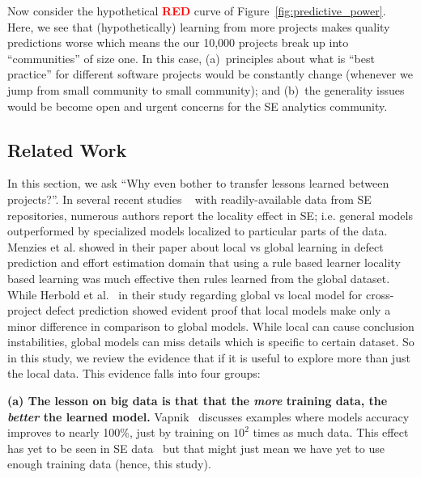 \documentclass[sigconf]{acmart}
\theoremstyle{break}
\begin{document}
Now consider the hypothetical \textcolor{red}{{\bf RED}} curve of Figure~\ref{fig:predictive_power}. Here, we see that (hypothetically)  learning from more projects makes quality predictions worse which means the our 10,000 projects break up into ``communities'' of size one. In this case,  (a)~principles about what is ``best practice'' for different software projects would be constantly change (whenever we jump from small community to small community); and (b)~the generality issues would be become open and urgent concerns for the SE analytics community.


\subsection{Related Work}
\label{sec:related}

In this section, we ask ``Why even bother to transfer lessons learned between projects?''. In several recent studies ~\cite{bettenburg2012think, menzies2012local, posnett2011ecological} with readily-available data from SE repositories, numerous authors report the locality effect in SE; i.e. general models outperformed by specialized models localized to particular parts of the data. Menzies et al. showed in their paper about local vs global learning in defect prediction and effort estimation domain that using a rule based learner locality based learning was much effective then rules learned from the global dataset. While Herbold et al.~\cite{herbold2017global} in their study regarding global vs local model for cross-project defect prediction showed evident proof that local models make only a minor difference in comparison to global models. While local can cause conclusion instabilities, global models can miss details which is specific to certain dataset. So in this study, we review the evidence that if it is useful to explore more than just the local data. This evidence falls into four groups:

\textbf{(a) The lesson on big data is that that the {\em more} training data, the {\em better} the learned model.} Vapnik~\cite{vapnik14} discusses examples where models accuracy improves to nearly 100\%, just by training on $10^2$ times as much data. This effect has yet to be seen in SE data~\cite{menzies2013guest} but that might just mean we have yet to use enough training data (hence, this study). 
\end{document}
